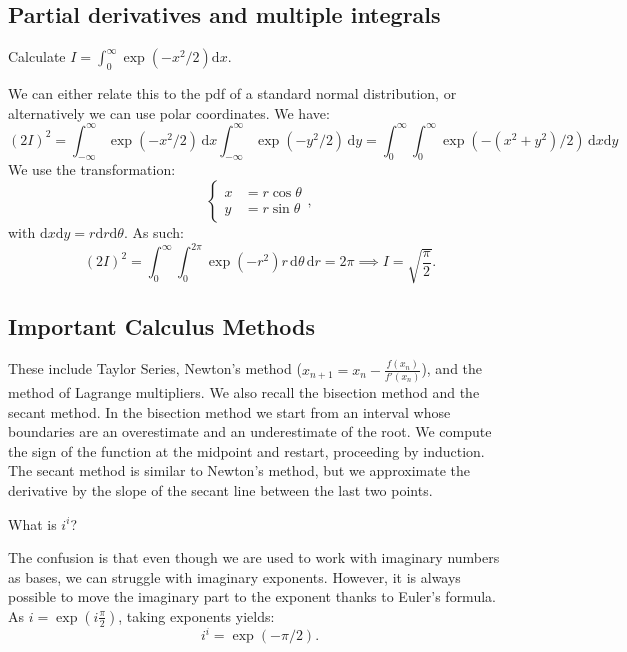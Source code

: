 \subsection{Partial derivatives and multiple integrals}

\begin{qanda}
    \Q 
    Calculate $I=\int_{0}^{\infty} \exp(-x^2 / 2) \mathrm{d}x$.

    \A
    We can either relate this to the pdf of a standard normal distribution, or alternatively we can use polar coordinates.
    We have: 
    \[
        (2I)^2 = \int_{-\infty}^{\infty} \exp(-x^2 / 2) \, \mathrm{d}x \int_{-\infty}^{\infty} \exp(-y^2 / 2) \, \mathrm{d}y =
\int_{0}^{\infty} \int_{0}^{\infty} \exp(-(x^2+y^2) / 2) \, \mathrm{d}x\mathrm{d}y
    \]
    We use the transformation:
    \[
        \begin{cases}
        x &= r \cos \theta \\
        y &= r \sin \theta
        \end{cases},
    \]
    with $\mathrm{d}x \mathrm{d}y = r \mathrm{d}r \mathrm{d}\theta$.
    As such:
    \[
        (2I)^2 = \int_{0}^{\infty} \int_{0}^{2\pi} \exp \left( -r^2 \right) r  \, \mathrm{d}\theta \, \mathrm{d}r = 2\pi \implies I = \sqrt{\frac{\pi}{2}}.
    \]
\end{qanda}

\subsection{Important Calculus Methods}

These include Taylor Series, Newton's method ($x_{n+1} = x_n - \frac{f(x_n)}{f'(x_n)}$), and the method of Lagrange multipliers.
We also recall the bisection method and the secant method.
In the bisection method we start from an interval whose boundaries are an overestimate and an underestimate of the root. We compute the sign of the function at the midpoint and restart, proceeding by induction.
The secant method is similar to Newton's method, but we approximate the derivative by the slope of the secant line between the last two points.

\begin{qanda}
    \Q
    What is $i^i$?

    \A
    The confusion is that even though we are used to work with imaginary numbers as bases, we can struggle with imaginary exponents.
    However, it is always possible to move the imaginary part to the exponent thanks to Euler's formula. As $i  = \exp \left( i \frac{\pi}{2} \right)$, taking exponents yields:
    \[
     i^i = \exp(-\pi / 2).
    \]
\end{qanda}


